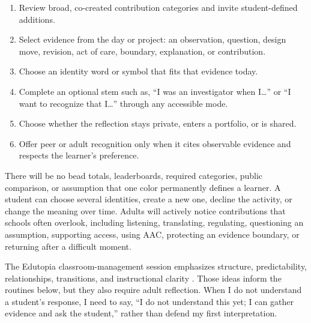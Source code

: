 \documentclass[11pt]{article}
\newcommand{\reviewsection}[1]{%
  \Needspace{4\baselineskip}
  \vspace{0.08in}\noindent{\normalsize\bfseries\color{PrimaryRed}#1}
  \par\vspace{0.025in}
}
\begin{document}
\begin{enumerate} 
  \setlength{\itemsep}{1pt}
  \setlength{\parskip}{0pt}
  \setlength{\parsep}{0pt}
  \setlength{\topsep}{2pt}
  
  \item Review broad, co-created contribution categories and invite student-defined additions.
  \item Select evidence from the day or project: an observation, question, design move, revision, act of care, boundary, explanation, or contribution.
  \item Choose an identity word or symbol that fits that evidence today.
  \item Complete an optional stem such as, ``I was an investigator when I\ldots'' or ``I want to recognize that I\ldots'' through any accessible mode.
  \item Choose whether the reflection stays private, enters a portfolio, or is shared.
  \item Offer peer or adult recognition only when it cites observable evidence and respects the learner's preference.
\end{enumerate}

There will be no bead totals, leaderboards, required categories, public comparison, or assumption that one color permanently defines a learner. A student can choose several identities, create a new one, decline the activity, or change the meaning over time. Adults will actively notice contributions that schools often overlook, including listening, translating, regulating, questioning an assumption, supporting access, using AAC, protecting an evidence boundary, or returning after a difficult moment.

\reviewsection{Routine-by-Routine Implementation}

The Edutopia classroom-management session emphasizes structure, predictability, relationships, transitions, and instructional clarity \citep{edutopiaClassroom}. Those ideas inform the routines below, but they also require adult reflection. When I do not understand a student's response, I need to say, ``I do not understand this yet; I can gather evidence and ask the student,'' rather than defend my first interpretation.
\end{document}
